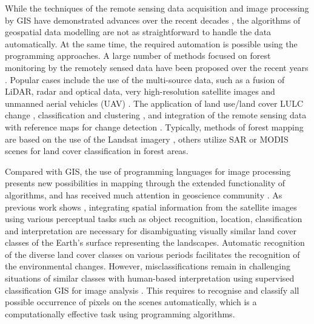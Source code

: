\documentclass[applsci,article,submit,pdftex,moreauthors]{Definitions/mdpi}
\begin{document}
While the techniques of the remote sensing data acquisition and image processing by GIS have demonstrated advances over the recent decades \cite{CHUMA2021100083,Westmanetal1989}, the algorithms of geospatial data modelling are not as straightforward to handle the data automatically. At the same time, the required automation is possible using the programming approaches. A large number of methods focused on forest monitoring by the remotely sensed data have been proposed over the recent years \cite{6350700,773475,PU2019268,6049235,OHMANN20143}. Popular cases include the use of the multi-source data, such as a fusion of LiDAR, radar and optical data, very high-resolution satellite images and unmanned aerial vehicles (UAV) \cite{rs12071087}. The application of land use/land cover LULC change \cite{lambin2003dynamics}, classification and clustering \cite{976841}, and integration of the remote sensing data with reference maps for change detection \cite{rs14164126}. Typically, methods of forest mapping are based on the use of the Landsat imagery \cite{1294510,Zhangetal2006,KIM2014178}, others utilize SAR \cite{rs11242999,858324,7326669,6352093,8035264} or MODIS scenes \cite{HANSEN20082495,ZHANG201974} for land cover classification in forest areas. 

Compared with GIS, the use of programming languages for image processing presents new possibilities in mapping through the extended functionality of algorithms, and has received much attention in geoscience community \cite{TRUJILLOJIMENEZ2022100703,VANSTRIEN2022105462,RODRIGUES2022711,5981114,ROBERTS2022105192}. As previous work shows \cite{LIAQAT2021100587,ASUQUOENOH2022,RAWAT201577}, integrating spatial information from the satellite images using various perceptual tasks such as object recognition, location, classification and interpretation are necessary for disambiguating visually similar land cover classes of the Earth's surface representing the landscapes. Automatic recognition of the diverse land cover classes on various periods facilitates the recognition of the environmental changes. However, misclassifications remain in challenging situations of similar classes with human-based interpretation using supervised classification GIS for image analysis \cite{HUSSAIN2022103117,ABDELSADEK2022815,HEDAYATI202273}. This requires to recognise and classify all possible occurrence of pixels on the scenes automatically, which is a computationally effective task using programming algorithms.
\end{document}
